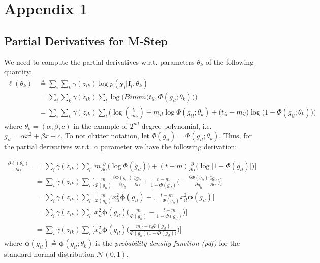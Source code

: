 \chapter{Appendix 1} \label{appendix1-ch}

\section{Partial Derivatives for M-Step}

We need to compute the partial derivatives w.r.t. parameters $\theta_{k}$ of the following quantity:
\begin{equation} \label{parameters-est2-EM-f-app}
  \begin{split}
	\ell(\theta_{k}) & \triangleq \sum_{i} \sum_{k} \gamma(z_{ik}) \log p(\mathbf{y}_{i}|\mathbf{f}_{i}, \theta_{k}) \\
					 & = \sum_{i} \sum_{k} \gamma(z_{ik}) \sum_{l} \log \bigg(Binom \big(t_{il}, \Phi(g_{il}; \theta_{k})\big) \bigg) \\
					 & =  \sum_{i} \sum_{k} \gamma(z_{ik}) \sum_{l} \bigg(\log \binom{t_{il}}{m_{il}} + m_{il} \log \Phi(g_{il}; \theta_{k}) + \big(t_{il} - m_{il} \big) \log \big(1 - \Phi(g_{il}; \theta_{k})\big)\bigg)
  \end{split}
\end{equation}
where $\theta_{k} = (\alpha, \beta, c)$ in the example of $2^{nd}$ degree polynomial, i.e. $g_{il} = \alpha x^{2} + \beta x + c$. To not clutter notation, let $\Phi(g_{il}) = \Phi(g_{il}; \theta_{k})$. Thus, for the partial derivatives w.r.t. $\alpha$ parameter we have the following derivation:

\begin{equation} \label{derivative-a-f-app}
  \begin{split}
	\frac{\partial \ell(\theta_{k})}{\partial \alpha} & = \sum_{i} \gamma(z_{ik}) \sum_{l} \bigg[ m \frac{\partial}{\partial \alpha}\big(\log \Phi(g_{il})\big) + (t-m) \frac{\partial}{\partial \alpha}\big(\log \big[1 - \Phi(g_{il})\big]\big)\bigg] \\
		& = \sum_{i} \gamma(z_{ik}) \sum_{l} \bigg[ \frac{m}{\Phi(g_{il})} \frac{\partial \Phi(g_{il})}{\partial g_{il}} \frac{\partial g_{il}}{\partial \alpha} + \frac{t - m}{1 - \Phi(g_{il})}\bigg( -\frac{\partial \Phi(g_{il})}{\partial g_{il}} \frac{\partial g_{il}}{\partial \alpha} \bigg) \bigg] \\
		& = \sum_{i} \gamma(z_{ik}) \sum_{l} \bigg[ \frac{m}{\Phi(g_{il})} x_{il}^{2} \mathbf{\phi}(g_{il}) - \frac{t - m}{1 - \Phi(g_{il})} x_{il}^{2} \mathbf{\phi}(g_{il}) \bigg]\\
		& = \sum_{i}  \gamma(z_{ik}) \sum_{l} \bigg[ x_{il}^{2} \mathbf{\phi}(g_{il})\bigg(\frac{m}{\Phi(g_{il})} - \frac{t - m}{1 - \Phi(g_{il})}\bigg) \bigg] \\
		& = \sum_{i}  \gamma(z_{ik}) \sum_{l} \bigg[ x_{il}^{2} \mathbf{\phi}(g_{il})\bigg(\frac{m_{il} - t_{il}\Phi(g_{il})}{\Phi(g_{il})\big(1-\Phi(g_{il})\big)} \bigg) \bigg]
	\end{split}
\end{equation}
where $\mathbf{\phi}(g_{il}) \triangleq \mathbf{\phi}(g_{il};\theta_{k})$ is the \emph{probability density function (pdf)} for the standard normal distribution $\mathcal{N}(0,1)$.

